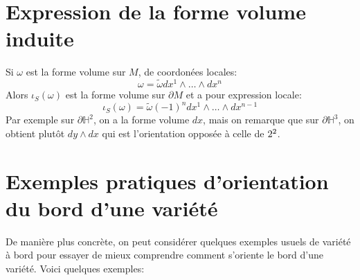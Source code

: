    \section{Expression de la forme volume induite}
      Si \( \omega \) est la forme volume sur \( M \), de coordonées locales:
      \[ 
         \omega = \widetilde{\omega} dx^1 \wedge \ldots \wedge dx^n 
      \]
      Alors \( \iota_{S}(\omega) \) est la forme volume sur \( \partial M \) et a pour expression locale:
      \[ 
         \iota_{S}(\omega) = \widetilde{\omega} (-1)^n dx^1 \wedge \ldots \wedge {dx^{n-1}}
      \]
      Par exemple sur \( \partial \mathbb{H}^2 \), on a la forme volume \( dx \), mais on remarque que sur \( \partial \mathbb{H}^3 \), on obtient plutôt \(dy \wedge dx\) qui est l'orientation opposée à celle de \( 2^2 \).
   \section{Exemples pratiques d'orientation du bord d'une variété}
      De manière plus concrète, on peut considérer quelques exemples usuels de variété à bord pour essayer de mieux comprendre comment s'oriente le bord d'une variété. Voici quelques exemples:
